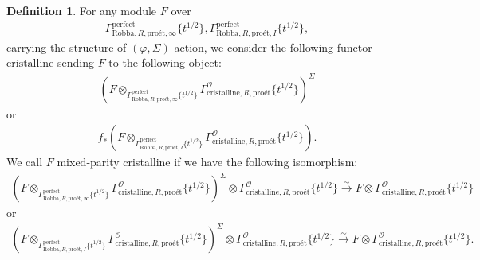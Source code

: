 \documentclass[12pt]{book}
\theoremstyle{definition}
\newtheorem{definition}{Definition}
\begin{document}
\begin{definition}
For any module $F$ over 
\begin{align}
\Gamma^\mathrm{perfect}_{\text{Robba},R,\text{pro\'et},\infty}\{t^{1/2}\},\Gamma^\mathrm{perfect}_{\text{Robba},R,\text{pro\'et},I}\{t^{1/2}\},
\end{align} 
carrying the structure of $(\varphi,\Sigma)$-action, we consider the following functor $\mathrm{cristalline}$ sending $F$ to the following object:
\begin{align}
(F\otimes_{\Gamma^\mathrm{perfect}_{\text{Robba},R,\text{pro\'et},\infty}\{t^{1/2}\}} \Gamma^\mathcal{O}_{\text{cristalline},R,\text{pro\'et}}\{t^{1/2}\})^\Sigma
\end{align}
or 
\begin{align}
f_*(F\otimes_{\Gamma^\mathrm{perfect}_{\text{Robba},R,\text{pro\'et},I}\{t^{1/2}\}} \Gamma^\mathcal{O}_{\text{cristalline},R,\text{pro\'et}}\{t^{1/2}\}).
\end{align}
We call $F$ mixed-parity cristalline if we have the following isomorphism:
\begin{align}
(F\otimes_{\Gamma^\mathrm{perfect}_{\text{Robba},R,\text{pro\'et},\infty}\{t^{1/2}\}} \Gamma^\mathcal{O}_{\text{cristalline},R,\text{pro\'et}}\{t^{1/2}\})^\Sigma \otimes \Gamma^\mathcal{O}_{\text{cristalline},R,\text{pro\'et}}\{t^{1/2}\} \overset{\sim}{\longrightarrow} F \otimes \Gamma^\mathcal{O}_{\text{cristalline},R,\text{pro\'et}}\{t^{1/2}\} 
\end{align}
or 
\begin{align}
(F\otimes_{\Gamma^\mathrm{perfect}_{\text{Robba},R,\text{pro\'et},I}\{t^{1/2}\}} \Gamma^\mathcal{O}_{\text{cristalline},R,\text{pro\'et}}\{t^{1/2}\})^\Sigma \otimes \Gamma^\mathcal{O}_{\text{cristalline},R,\text{pro\'et}}\{t^{1/2}\} \overset{\sim}{\longrightarrow} F \otimes \Gamma^\mathcal{O}_{\text{cristalline},R,\text{pro\'et}}\{t^{1/2}\}. 
\end{align}
\end{definition}
\end{document}
